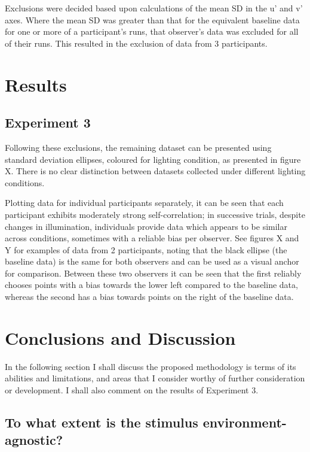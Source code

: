 Exclusions were decided based upon calculations of the mean SD in the u' and v' axes. Where the mean SD was greater than that for the equivalent baseline data for one or more of a participant's runs, that observer's data was excluded for all of their runs. This resulted in the exclusion of data from 3 participants.


\section{Results}

\subsection{Experiment 3}

Following these exclusions, the remaining dataset can be presented using standard deviation ellipses, coloured for lighting condition, as presented in figure X. There is no clear distinction between datasets collected under different lighting conditions.


Plotting data for individual participants separately, it can be seen that each participant exhibits moderately strong self-correlation; in successive trials, despite changes in illumination, individuals provide data which appears to be similar across conditions, sometimes with a reliable bias per observer. See figures X and Y for examples of data from 2 participants, noting that the black ellipse (the baseline data) is the same for both observers and can be used as a visual anchor for comparison. Between these two observers it can be seen that the first reliably chooses points with a bias towards the lower left compared to the baseline data, whereas the second has a bias towards points on the right of the baseline data. 



\section{Conclusions and Discussion}

In the following section I shall discuss the proposed methodology is terms of its abilities and limitations, and areas that I consider worthy of further consideration or development. I shall also comment on the results of Experiment 3.

\subsection{To what extent is the stimulus environment-agnostic?}

